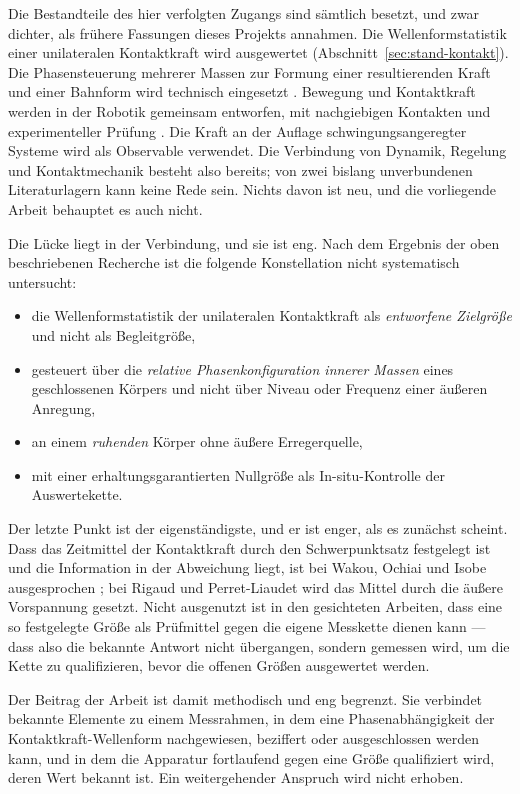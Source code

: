 \documentclass[12pt,a4paper]{report}
\begin{document}
Die Bestandteile des hier verfolgten Zugangs sind sämtlich besetzt, und
zwar dichter, als frühere Fassungen dieses Projekts annahmen. Die
Wellenformstatistik einer unilateralen Kontaktkraft wird ausgewertet
(Abschnitt~\ref{sec:stand-kontakt}). Die Phasensteuerung mehrerer Massen
zur Formung einer resultierenden Kraft und einer Bahnform wird technisch
eingesetzt \cite{chen2019, osadchyy2023, gurskyi2023}. Bewegung und
Kontaktkraft werden in der Robotik gemeinsam entworfen, mit nachgiebigen
Kontakten und experimenteller Prüfung
\cite{chatzinikolaidis2020, chatzinikolaidis2021}. Die Kraft an der
Auflage schwingungsangeregter Systeme wird als Observable verwendet. Die
Verbindung von Dynamik, Regelung und Kontaktmechanik besteht also
bereits; von zwei bislang unverbundenen Literaturlagern kann keine Rede
sein. Nichts davon ist neu, und die vorliegende Arbeit behauptet es
auch nicht.

Die Lücke liegt in der Verbindung, und sie ist eng. Nach dem Ergebnis
der oben beschriebenen Recherche ist die folgende Konstellation nicht
systematisch untersucht:

\begin{itemize}
\item die Wellenformstatistik der unilateralen Kontaktkraft als
      \emph{entworfene Zielgröße} und nicht als Begleitgröße,
\item gesteuert über die \emph{relative Phasenkonfiguration innerer
      Massen} eines geschlossenen Körpers und nicht über Niveau oder
      Frequenz einer äußeren Anregung,
\item an einem \emph{ruhenden} Körper ohne äußere Erregerquelle,
\item mit einer erhaltungsgarantierten Nullgröße als
      In-situ-Kontrolle der Auswertekette.
\end{itemize}

Der letzte Punkt ist der eigenständigste, und er ist enger, als es
zunächst scheint. Dass das Zeitmittel der Kontaktkraft durch den
Schwerpunktsatz festgelegt ist und die Information in der Abweichung
liegt, ist bei Wakou, Ochiai und Isobe ausgesprochen
\cite{wakou2008}; bei Rigaud und Perret-Liaudet wird das Mittel durch
die äußere Vorspannung gesetzt. Nicht ausgenutzt ist in den gesichteten
Arbeiten, dass eine so festgelegte Größe als Prüfmittel gegen die eigene
Messkette dienen kann --- dass also die bekannte Antwort nicht
übergangen, sondern gemessen wird, um die Kette zu qualifizieren, bevor
die offenen Größen ausgewertet werden.

Der Beitrag der Arbeit ist damit methodisch und eng begrenzt. Sie
verbindet bekannte Elemente zu einem Messrahmen, in dem eine
Phasenabhängigkeit der Kontaktkraft-Wellenform nachgewiesen, beziffert
oder ausgeschlossen werden kann, und in dem die Apparatur fortlaufend
gegen eine Größe qualifiziert wird, deren Wert bekannt ist. Ein
weitergehender Anspruch wird nicht erhoben.
\end{document}
